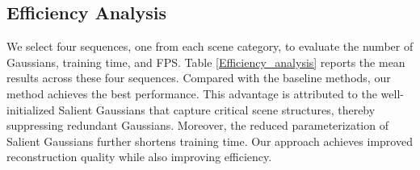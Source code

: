 \documentclass[letterpaper, 10 pt, conference]{ieeeconf}  %
\begin{document}
\subsection{Efficiency Analysis}

We select four sequences, one from each scene category, to evaluate the number of Gaussians, training time, and FPS. Table \ref{Efficiency_analysis} reports the mean results across these four sequences. Compared with the baseline methods, our method achieves the best performance. This advantage is attributed to the well-initialized Salient Gaussians that capture critical scene structures, thereby suppressing redundant Gaussians. Moreover, the reduced parameterization of Salient Gaussians further shortens training time. Our approach achieves improved reconstruction quality while also improving efficiency.



\end{document}
